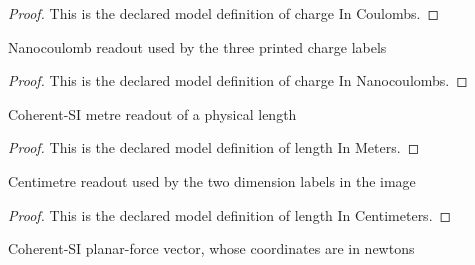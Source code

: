 \begin{proof}
  This is the declared model definition of charge In Coulombs.
\end{proof}
\begin{definition}
  \label{def:physics:phyx-mini-0896:phyxminiproblems-problemphyxmini0896-chargeinnanocoulombs}
  Nanocoulomb readout used by the three printed charge labels
\end{definition}
\begin{proof}
  This is the declared model definition of charge In Nanocoulombs.
\end{proof}
\begin{definition}
  \label{def:physics:phyx-mini-0896:phyxminiproblems-problemphyxmini0896-lengthinmeters}
  Coherent-SI metre readout of a physical length
\end{definition}
\begin{proof}
  This is the declared model definition of length In Meters.
\end{proof}
\begin{definition}
  \label{def:physics:phyx-mini-0896:phyxminiproblems-problemphyxmini0896-lengthincentimeters}
  Centimetre readout used by the two dimension labels in the image
\end{definition}
\begin{proof}
  This is the declared model definition of length In Centimeters.
\end{proof}
\begin{definition}
  \label{def:physics:phyx-mini-0896:phyxminiproblems-problemphyxmini0896-forcevectorinnewtons}
  Coherent-SI planar-force vector, whose coordinates are in newtons
\end{definition}
